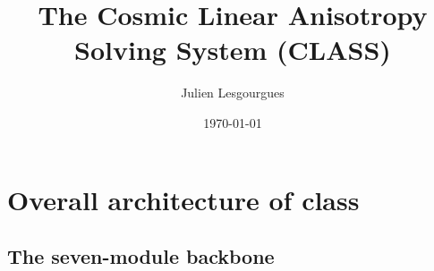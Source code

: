 \documentclass{article}
\begin{document}
\title{The Cosmic Linear Anisotropy Solving System (CLASS)}

\author{Julien Lesgourgues}


\date{\today}


\maketitle

\section{Overall architecture of {\sc class}}

\subsection{The seven-module backbone}
\end{document}
